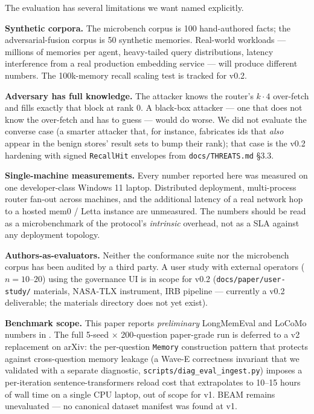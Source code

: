 \documentclass[11pt,letterpaper,twocolumn]{article}
\begin{document}
The evaluation has several limitations we want named explicitly.

\textbf{Synthetic corpora.} The microbench corpus is 100 hand-authored facts; the adversarial-fusion corpus is 50 synthetic memories. Real-world workloads --- millions of memories per agent, heavy-tailed query distributions, latency interference from a real production embedding service --- will produce different numbers. The 100k-memory recall scaling test is tracked for v0.2.

\textbf{Adversary has full knowledge.} The  attacker knows the router's $k \cdot 4$ over-fetch and fills exactly that block at rank 0. A black-box attacker --- one that does not know the over-fetch and has to guess --- would do worse. We did not evaluate the converse case (a smarter attacker that, for instance, fabricates ids that \emph{also} appear in the benign stores' result sets to bump their rank); that case is the v0.2 hardening with signed \texttt{RecallHit} envelopes from \texttt{docs/THREATS.md} \S3.3.

\textbf{Single-machine measurements.} Every number reported here was measured on one developer-class Windows 11 laptop. Distributed deployment, multi-process router fan-out across machines, and the additional latency of a real network hop to a hosted mem0 / Letta instance are unmeasured. The numbers should be read as a microbenchmark of the protocol's \emph{intrinsic} overhead, not as a SLA against any deployment topology.

\textbf{Authors-as-evaluators.} Neither the conformance suite nor the microbench corpus has been audited by a third party. A user study with external operators ($n=10$--$20$) using the governance UI is in scope for v0.2 (\texttt{docs/paper/user-study/} materials, NASA-TLX instrument, IRB pipeline --- currently a v0.2 deliverable; the materials directory does not yet exist).

\textbf{Benchmark scope.} This paper reports \emph{preliminary} LongMemEval and LoCoMo numbers in . The full 5-seed $\times$ 200-question paper-grade run is deferred to a v2 replacement on arXiv: the per-question \texttt{Memory} construction pattern that protects against cross-question memory leakage (a Wave-E correctness invariant that we validated with a separate diagnostic, \texttt{scripts/diag\_eval\_ingest.py}) imposes a per-iteration sentence-transformers reload cost that extrapolates to 10--15 hours of wall time on a single CPU laptop, out of scope for v1. BEAM remains unevaluated --- no canonical dataset manifest was found at v1.
\end{document}
